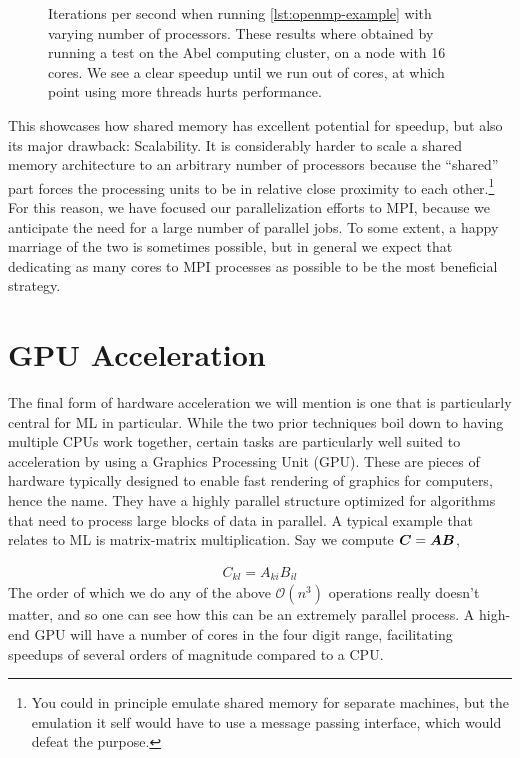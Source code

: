 \documentclass[Thesis.tex]{subfiles}
\begin{document}
\begin{figure}[h]
  \centering
    \resizebox{0.7\linewidth}{!}{%
        
    }
  \caption{Iterations per second when running \cref{lst:openmp-example} with
    varying number of processors. These results where obtained by running a test
    on the Abel computing cluster, on a node with 16 cores. We see a clear
    speedup until we run out of cores, at which point using more threads hurts
    performance.}
  \label{fig:mpi-example}
\end{figure}

This showcases how shared memory has excellent potential for speedup, but also
its major drawback: Scalability. It is considerably harder to scale a shared
memory architecture to an arbitrary number of processors because the ``shared''
part forces the processing units to be in relative close proximity to each
other.\footnote{You could in principle emulate shared memory for separate
  machines, but the emulation it self would have to use a message passing
  interface, which would defeat the purpose.} For this reason, we have focused
our parallelization efforts to MPI, because we anticipate the need for a large
number of parallel jobs. To some extent, a happy marriage of the two is
sometimes possible, but in general we expect that dedicating as many cores to
MPI processes as possible to be the most beneficial strategy.


\section{GPU Acceleration}

The final form of hardware acceleration we will mention is one that is
particularly central for ML in particular. While the two prior techniques boil
down to having multiple CPUs work together, certain tasks are particularly well
suited to acceleration by using a Graphics Processing Unit (GPU). These are
pieces of hardware typically designed to enable fast rendering of graphics for
computers, hence the name. They have a highly parallel structure optimized for
algorithms that need to process large blocks of data in parallel. A typical
example that relates to ML is matrix-matrix multiplication. Say we compute $\bm{C} = \bm{A} \bm{B}$,

\begin{align}
  C_{kl} = A_{ki}B_{il}
\end{align}
The order of which we do any of the above $\mathcal{O}(n^3)$ operations really
doesn't matter, and so one can see how this can be an extremely parallel
process. A high-end GPU will have a number of cores in the four digit range,
facilitating speedups of several orders of magnitude compared to a CPU.
\end{document}
